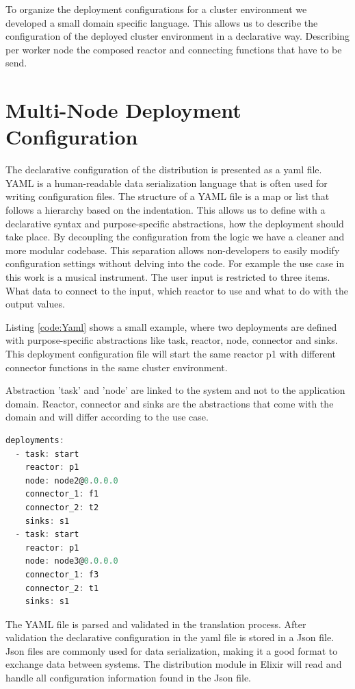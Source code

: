 \documentclass[a4paper]{book}
\begin{document}
To organize the deployment configurations for a cluster environment we developed a small domain specific language. This allows us to describe the configuration of the deployed cluster environment in a declarative way. Describing per worker node the composed reactor and connecting functions that have to be send. 

\section{Multi-Node Deployment Configuration}
The declarative configuration of the distribution is presented as a yaml file. YAML is a human-readable data serialization language that is often used for writing configuration files. The structure of a YAML file is a map or list that follows a hierarchy based on the indentation. This allows us to define with a declarative syntax and purpose-specific abstractions, how the deployment should take place. By decoupling the configuration from the logic we have a cleaner and more modular codebase. This separation allows non-developers to easily modify configuration settings without delving into the code. For example the use case in this work is a musical instrument. The user input is restricted to three items. What data to connect to the input, which reactor to use and what to do with the output values. 

Listing \ref{code:Yaml} shows a small example, where two deployments are defined with purpose-specific abstractions like task, reactor, node, connector and sinks. This deployment configuration file will start the same reactor p1 with different connector functions in the same cluster environment. 

Abstraction 'task' and 'node' are linked to the system and not to the application domain. Reactor, connector and sinks are the abstractions that come with the domain and will differ according to the use case. 


\begin{lstlisting}[language=C, caption={YAML code}, captionpos=b,label={code:Yaml}, basicstyle=\ttfamily, frame=single]
deployments:
  - task: start
    reactor: p1
    node: node2@0.0.0.0
    connector_1: f1
    connector_2: t2
    sinks: s1
  - task: start
    reactor: p1
    node: node3@0.0.0.0
    connector_1: f3
    connector_2: t1
    sinks: s1
\end{lstlisting}

The YAML file is parsed and validated in the translation process. After validation the declarative configuration in the yaml file is stored in a Json file. Json files are commonly used for data serialization, making it a good format to exchange data between systems. The distribution module in Elixir will read and handle all configuration information found in the Json file.
\end{document}
